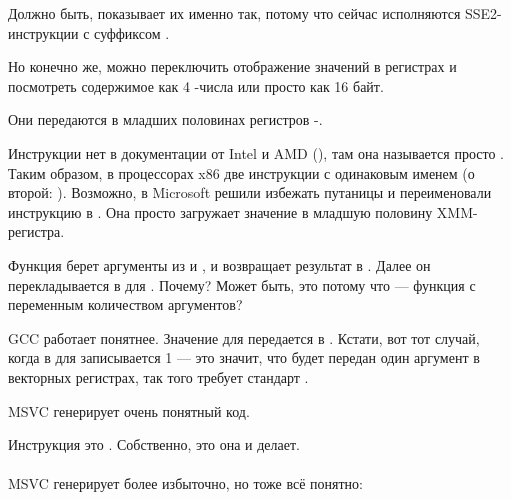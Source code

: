 Должно быть, \olly показывает их именно так, потому что сейчас исполняются SSE2-инструкции
с суффиксом .

Но конечно же, можно переключить отображение значений в регистрах и посмотреть содержимое
как 4 \Tfloat{}-числа или просто как 16 байт.

\clearpage
{}



Они передаются в младших половинах регистров -.



Инструкции  нет в документации от Intel и AMD  (), там она называется просто .
Таким образом, в процессорах x86 две инструкции с одинаковым именем (о второй: ).
Возможно, в Microsoft решили избежать путаницы и переименовали инструкцию в .
Она просто загружает значение в младшую половину XMM-регистра.

Функция  берет аргументы из  и , 
и возвращает результат в .
Далее он перекладывается в \RDX для \printf. 
Почему? 
Может быть, это потому что 
\printf --- функция с переменным количеством аргументов?



GCC работает понятнее. 
Значение для \printf передается в . 
Кстати, вот тот случай, когда в \EAX
для \printf записывается 1 --- это значит, что будет передан один аргумент в векторных регистрах, 
так того требует стандарт \SysVABI.







\Optimizing MSVC генерирует очень понятный код.

Инструкция  это . Собственно, это она и делает.\\
\\
\NonOptimizing MSVC генерирует более избыточно, но тоже всё понятно:

